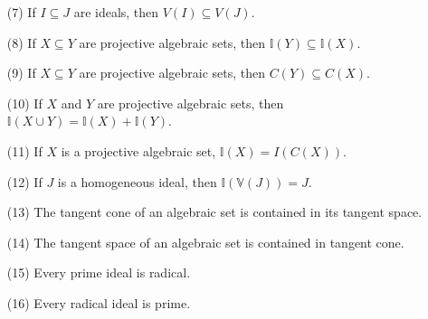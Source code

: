 \documentclass{article}
\begin{document}
\begin{itemize}
        \item [(7)] If $I \subseteq J$ are ideals, then $V(I) \subseteq V(J)$.

        \item [(8)] If $X \subseteq Y$ are projective algebraic sets, then $\mathbb{I}(Y) \subseteq \mathbb{I}(X)$.

        \item [(9)] If $X \subseteq Y$ are projective algebraic sets, then $C(Y) \subseteq C(X)$.

        \item [(10)] If $X$ and $Y$ are projective algebraic sets, then $\mathbb{I}(X \cup Y) = \mathbb{I}(X) + \mathbb{I}(Y)$.

        \item [(11)] If $X$ is a projective algebraic set, $\mathbb{I}(X) = I(C(X))$.

        \item [(12)] If $J$ is a homogeneous ideal, then $\mathbb{I}(\mathbb{V}(J)) = J$.

        \item [(13)] The tangent cone of an algebraic set is contained in its tangent space.

        \item [(14)] The tangent space of an algebraic set is contained in tangent cone.

        \item [(15)] Every prime ideal is radical.

        \item [(16)] Every radical ideal is prime. 
    \end{itemize}
\end{document}
